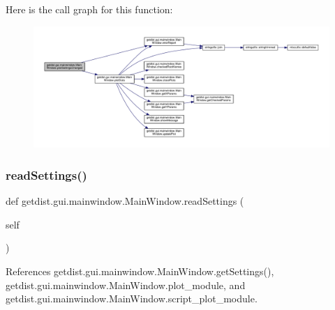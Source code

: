 Here is the call graph for this function\+:
\nopagebreak
\begin{figure}[H]
\begin{center}
\leavevmode
\includegraphics[width=350pt]{classgetdist_1_1gui_1_1mainwindow_1_1MainWindow_ab2251d26d381d446a19a21de18bcb7dd_cgraph}
\end{center}
\end{figure}
\mbox{\label{classgetdist_1_1gui_1_1mainwindow_1_1MainWindow_a7e29a3ab6b2531c8680823bd4ae26c1d}} 
\subsubsection{\texorpdfstring{read\+Settings()}{readSettings()}}
{\footnotesize\ttfamily def getdist.\+gui.\+mainwindow.\+Main\+Window.\+read\+Settings (\begin{DoxyParamCaption}\item[{}]{self }\end{DoxyParamCaption})}



References getdist.\+gui.\+mainwindow.\+Main\+Window.\+get\+Settings(), getdist.\+gui.\+mainwindow.\+Main\+Window.\+plot\+\_\+module, and getdist.\+gui.\+mainwindow.\+Main\+Window.\+script\+\_\+plot\+\_\+module.

